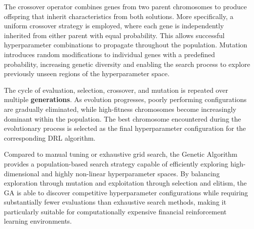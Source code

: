 The crossover operator combines genes from two parent chromosomes to produce
offspring that inherit characteristics from both solutions. More specifically,
a uniform crossover strategy is employed, where each gene is independently
inherited from either parent with equal probability. This allows successful
hyperparameter combinations to propagate throughout the population. Mutation
introduces random modifications to individual genes with a predefined
probability, increasing genetic diversity and enabling the search process to
explore previously unseen regions of the hyperparameter space.

The cycle of evaluation, selection, crossover, and mutation is repeated over
multiple \textbf{generations}. As evolution progresses, poorly performing
configurations are gradually eliminated, while high-fitness chromosomes become
increasingly dominant within the population. The best chromosome encountered
during the evolutionary process is selected as the final hyperparameter
configuration for the corresponding DRL algorithm.

Compared to manual tuning or exhaustive grid search, the Genetic Algorithm
provides a population-based search strategy capable of efficiently exploring
high-dimensional and highly non-linear hyperparameter spaces. By balancing
exploration through mutation and exploitation through selection and elitism,
the GA is able to discover competitive hyperparameter configurations while
requiring substantially fewer evaluations than exhaustive search methods,
making it particularly suitable for computationally expensive financial
reinforcement learning environments.